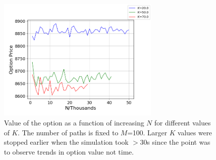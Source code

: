 \documentclass{article}
\begin{document}
\begin{figure}[!bh]
\includegraphics[width=0.7\textwidth,center]{task_2_2_plot_5.png}
\caption{Value of the option as a function of increasing $N$ for different values of $K$.
The number of paths is fixed to $M$=100. Larger $K$ values were stopped earlier when the simulation took $>30$s since the point was to observe trends in option value not time.}
\label{fig:k_n}
\end{figure}
\end{document}
